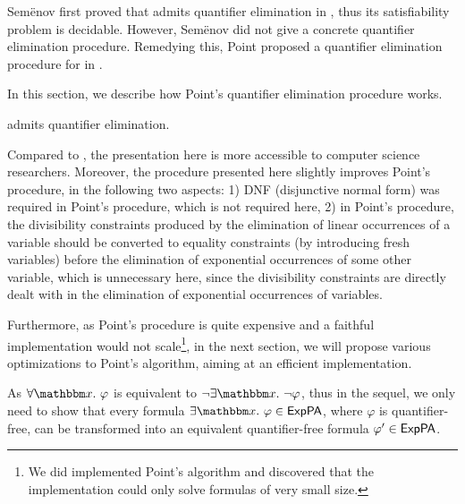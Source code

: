
Sem\"{e}nov first proved that  {\paexp} admits quantifier elimination in \cite{Semenov84}, thus its satisfiability problem is decidable. However, Sem\"{e}nov did not give a concrete quantifier elimination procedure. Remedying this, Point proposed a quantifier elimination procedure for {\paexp} in \cite{Point86}. 

In this section, we describe how Point's quantifier elimination procedure works. 
%
\begin{theorem}
\label{thm-paexp}
{\paexp} admits quantifier elimination.
\end{theorem}
%
Compared to \cite{Point86}, the presentation here is more accessible to computer science researchers. Moreover, the procedure presented here slightly improves Point's procedure, in the following two aspects: 1) DNF (disjunctive normal form) was required in Point's procedure, which is not required here, 2) in Point's procedure, the divisibility constraints produced by the elimination of linear occurrences of a variable should be converted to equality constraints (by introducing fresh variables) before the elimination of exponential occurrences of some other variable, which is unnecessary here, since the divisibility constraints are directly dealt with in the elimination of exponential occurrences of variables.
%
%

Furthermore, as Point's procedure is quite expensive and a faithful implementation would not scale\footnote{We did implemented Point's algorithm and discovered that the implementation could only solve formulas of very small size.},
in the next section, we will propose various optimizations to Point's algorithm, aiming at an efficient implementation. 

\smallskip

As $\forall \ivarx. \ \varphi$ is equivalent to $\neg \exists \ivarx. \ \neg \varphi$,  thus in the sequel, we only need to  show that every {\paexp} formula $\exists \ivarx.\ \varphi \in \paexp$, where $\varphi$ is quantifier-free, can be transformed into an equivalent quantifier-free formula $\varphi' \in {\sf ExpPA}$.



